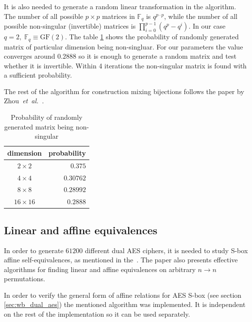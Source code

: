 \documentclass[11pt,oneside,final]{fithesis2}
\newcommand{\gf}{\ensuremath{\text{GF}\left(2\right)}}
\newcommand{\eal}{\emph{et~al.}}
\begin{document}
    It is also needed to generate a random linear transformation in the algorithm. The number of all possible $p \times p$ matrices 
    in $\mathbb{F}_q$ is $q^{p\cdot p}$, while the number of all possible non-singular (invertible) matrices is $\prod_{i=0}^{p-1}(q^p - q^i)$.
    In our case $q=2, \; \mathbb{F}_q \equiv \gf$. The table \ref{tbl:random_matrix_nonsingular_probab} shows the probability of randomly generated matrix of particular 
    dimension being non-singluar. For our parameters the value converges around $0.2888$ so it is enough to generate a random matrix
    and test whether it is invertible. Within 4 iterations the non-singular matrix is found with a sufficient probability.

    The rest of the algorithm for construction mixing bijections follows the paper by Zhou~\eal~\citep{journals/iacr/XiaoZ02}.
    
    \begin{table}[!htb]
    \begin{center}
    \begin{tabular}{ | c | r | }
	\hline
	dimension     & probability    \\ \hline \hline
	$2\times2$    & $0.375$        \\ \hline
	$4\times4$    & $ 0.30762$     \\ \hline
	$8\times8$    & $ 0.28992$     \\ \hline
	$16\times16$  & $ 0.2888$      \\ \hline
    \end{tabular}
    \caption{Probability of randomly generated matrix being non-singular}
    \label{tbl:random_matrix_nonsingular_probab}
    \end{center} 
    \end{table}
    
    \subsection{Linear and affine equivalences}\label{sec:linearAffineEqImpl}
    In order to generate $61200$ different dual AES ciphers, it is needed to study S-box affine self-equivalences, as mentioned in the~\citep{Biryukov:2003:TCL:1766171.1766175}.
    The paper also presents effective algorithms for finding linear and affine equivalences on arbitrary $n \rightarrow n$ permutations. 
    
    In order to verify the general form of affine relations for AES S-box (see section \ref{sec:wb_dual_aes}) the mentioned algorithm was implemented. It is independent 
    on the rest of the implementation so it can be used separately. 
    
\end{document}
